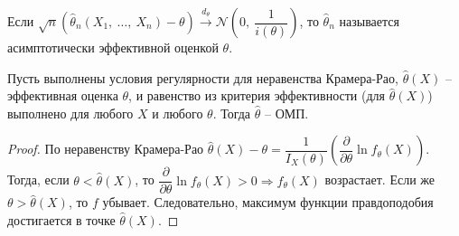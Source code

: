 \begin{definition}
    Если $\displaystyle \sqrt{n}(\hat{\theta }_{n}( X_{1} ,\ \dotsc ,\ X_{n}) -\theta )\xrightarrow{d_{\theta }}\mathcal{N}\left( 0,\ \dfrac{1}{i( \theta )}\right)$, то $\displaystyle \hat{\theta }_{n}$ называется асимптотически эффективной оценкой $\displaystyle \theta $.
\end{definition}
\begin{proposition}
    Пусть выполнены условия регулярности для неравенства Крамера-Рао, $\displaystyle \hat{\theta }( X)$ -- эффективная оценка $\displaystyle \theta $, и равенство из критерия эффективности (для $\displaystyle \hat{\theta }( X)$) выполнено для любого $\displaystyle X$ и любого $\displaystyle \theta $. Тогда $\displaystyle \hat{\theta }$ -- ОМП.
\end{proposition}
\begin{proof}
    По неравенству Крамера-Рао $\displaystyle \hat{\theta }( X) -\theta =\dfrac{1}{I_{X}( \theta )}\left(\dfrac{\partial }{\partial \theta }\ln f_{\theta }( X)\right)$. Тогда, если $\displaystyle \theta < \hat{\theta }( X)$, то $\displaystyle \dfrac{\partial }{\partial \theta }\ln f_{\theta }( X)  >0\Rightarrow f_{\theta }( X)$ возрастает. Если же $\displaystyle \theta  >\hat{\theta }( X)$, то $\displaystyle f$ убывает. Следовательно, максимум функции правдоподобия достигается в точке $\displaystyle \hat{\theta }( X)$.
\end{proof}